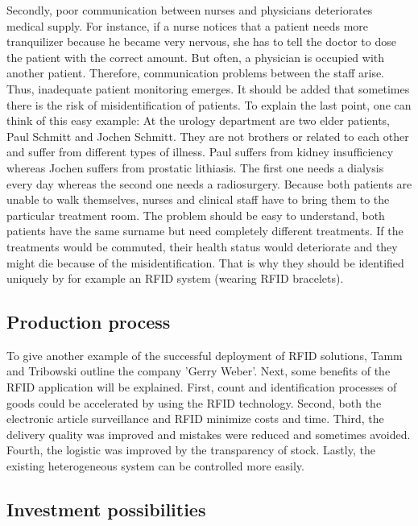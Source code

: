 Secondly, poor communication between nurses and physicians deteriorates medical supply. For instance, if a nurse notices that a patient needs more tranquilizer because he became very nervous, she has to tell the doctor to dose the patient with the correct amount. But often, a physician is occupied with another patient. Therefore, communication problems between the staff arise. Thus, inadequate patient monitoring emerges. It should be added that sometimes there is the risk of misidentification of patients.
To explain the last point, one can think of this easy example: At the urology department are two elder patients, Paul Schmitt and Jochen Schmitt. They are not brothers or related to each other and suffer from different types of illness. Paul suffers from kidney insufficiency whereas Jochen suffers from prostatic lithiasis. The first one needs a dialysis every day whereas the second one needs a radiosurgery. Because both patients are unable to walk themselves, nurses and clinical staff have to bring them to the particular treatment room. The problem should be easy to understand, both patients have the same surname but need completely different treatments. If the treatments would be commuted, their health status would deteriorate and they might die because of the misidentification. That is why they should be identified uniquely by for example an RFID system (wearing RFID bracelets).

\subsection{Production process}

To give another example of the successful deployment of RFID solutions, Tamm and Tribowski \cite[p.110 ff.]{fokus} outline the company 'Gerry Weber'. Next, some benefits of the RFID application will be explained. First, count and identification processes of goods could be accelerated by using the RFID technology. Second, both the electronic article surveillance and RFID minimize costs and time. Third, the delivery quality was improved and mistakes were reduced and sometimes avoided. Fourth, the logistic was improved by the transparency of stock. Lastly, the existing heterogeneous system can be controlled more easily. 

\subsection{Investment possibilities}

